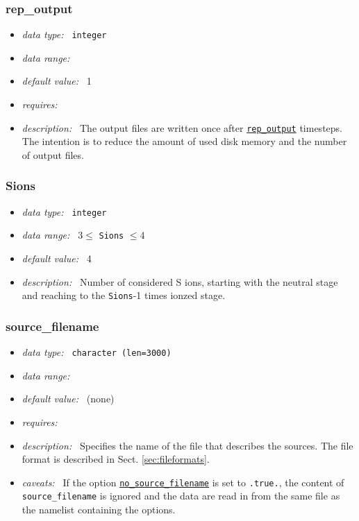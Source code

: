 \documentclass[a4paper,10pt]{article}
\begin{document}
\subsubsection{rep\_output}
\label{opt:repoutput}
\begin{itemize}
 \item \textit{data type:~} \texttt{integer}
 \item \textit{data range:~}
 \item \textit{default value:~} 1
 \item \textit{requires:~}
 \item \textit{description:~} The output files are written once after 
 \texttt{\hyperref[opt:repoutput]{rep\_output}} timesteps.
  The intention is to reduce the amount of used disk memory and the number of 
  output files.
\end{itemize}


\subsubsection{Sions}
\label{opt:sions}
\begin{itemize}
 \item \textit{data type:~} \texttt{integer}
 \item \textit{data range:~}  $3 \leq$ \texttt{Sions} $\leq 4$ 
 \item \textit{default value:~} 4
 \item \textit{description:~} Number of considered S ions, starting with the 
 neutral stage and reaching to  the \texttt{Sions}-1 times ionzed stage.
\end{itemize}


\subsubsection{source\_filename}
\label{opt:sourcefilename}
\begin{itemize}
 \item \textit{data type:~} \texttt{character (len=3000)}
 \item \textit{data range:~}
 \item \textit{default value:~} (none)
 \item \textit{requires:~}
 \item \textit{description:~} Specifies the name of the file that describes 
  the sources. 
  The file format is described in Sect. \ref{sec:fileformats}.
 \item \textit{caveats:~}
  If the option \hyperref[opt:nosourcefilename]{\texttt{no\_source\_filename}} 
  is set to \texttt{.true.}, the content of \texttt{source\_filename} is 
  ignored and the data are read in from the same file as the namelist 
  containing the options. 
\end{itemize}
\end{document}
